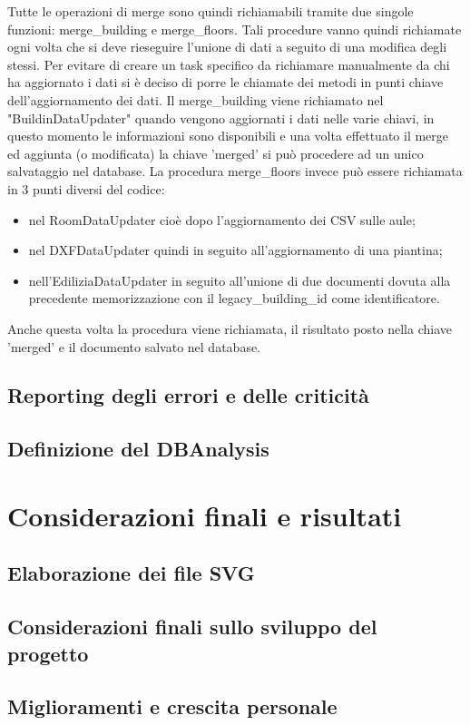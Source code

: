 \documentclass[12pt]{report}
\begin{document}
Tutte le operazioni di merge sono quindi richiamabili tramite due singole funzioni: merge\_building e merge\_floors.
Tali procedure vanno quindi richiamate ogni volta che si deve rieseguire l'unione di dati a seguito di una modifica degli stessi.
Per evitare di creare un task specifico da richiamare manualmente da chi ha aggiornato i dati si è deciso di porre le chiamate dei metodi in punti chiave dell'aggiornamento dei dati.
Il merge\_building viene richiamato nel "BuildinDataUpdater" quando vengono aggiornati i dati nelle varie chiavi, in questo momento le informazioni sono disponibili e una volta effettuato il merge ed aggiunta (o modificata) la chiave 'merged' si può procedere ad un unico salvataggio nel database.
La procedura merge\_floors invece può essere richiamata in 3 punti diversi del codice:
\begin{itemize}
\item nel RoomDataUpdater cioè dopo l'aggiornamento dei CSV sulle aule;
\item nel DXFDataUpdater quindi in seguito all'aggiornamento di una piantina;
\item nell'EdiliziaDataUpdater in seguito all'unione di due documenti dovuta alla precedente memorizzazione con il legacy\_building\_id come identificatore.  
\end{itemize}    

Anche questa volta la procedura viene richiamata, il risultato posto nella chiave 'merged' e il documento salvato nel database.



\newpage
\section{Reporting degli errori e delle criticità}

\newpage
\section{Definizione del DBAnalysis}


\chapter{Considerazioni finali e risultati}
\label{cap3}

\section{Elaborazione dei file SVG}

\newpage
\section{Considerazioni finali sullo sviluppo del progetto}

\newpage
\section{Miglioramenti e crescita personale}


%
%

%
%
\begin{thebibliography}{00}
%
\bibitem{}

%
\end{thebibliography}
% 
\end{document}
